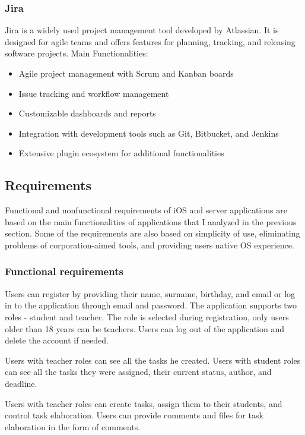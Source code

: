 \documentclass[
  biblatex = false,
  language=english,
  figures=false,
  sourcecodes,
  glossaries,
  index
]{kidiplom}
\begin{document}
\subsubsection{Jira}
Jira is a widely used project management tool developed by Atlassian. It is designed for agile teams and offers features for planning, tracking, and releasing software projects. Main Functionalities:
\begin{itemize}
	\item Agile project management with Scrum and Kanban boards
	\item Issue tracking and workflow management
         \item Customizable dashboards and reports
	\item Integration with development tools such as Git, Bitbucket, and Jenkins
	\item Extensive plugin ecosystem for additional functionalities
\end{itemize}

\subsection{Requirements}
Functional and nonfunctional requirements of iOS and server applications are based on the main functionalities of applications that I analyzed in the previous section. Some of the requirements are also based on simplicity of use, eliminating problems of corporation-aimed tools, and providing users native OS experience.

\subsubsection{Functional requirements}

Users can register by providing their name, surname, birthday, and email or log in to the application through email and password. The application supports two roles - student and teacher. The role is selected during registration, only users older than 18 years can be teachers. Users can log out of the application and delete the account if needed.

Users with teacher roles can see all the tasks he created. Users with student roles can see all the tasks they were assigned, their current status, author, and deadline. 

Users with teacher roles can create tasks, assign them to their students, and control task elaboration. Users can provide comments and files for task elaboration in the form of comments.
\end{document}
